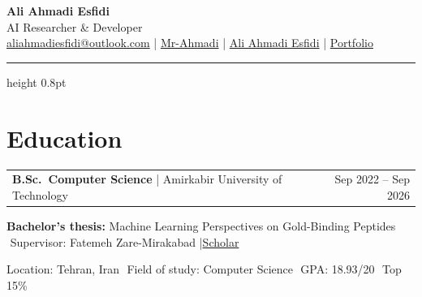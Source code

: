 \documentclass[10pt,a4paper]{article}
\makeatletter
\newcommand{\tdot}{{\color{dotcol}\,\textbullet\,\allowbreak}}
\newcommand{\cvbullet}{\item[\color{accent}\tiny\faCircle]}
\newcommand{\cvhead}[3]{%
    \begin{tabularx}{\linewidth}{@{}Xr@{}}
        \textbf{\color{darkgray}#1}%
        \textcolor{rulecol}{\small\;|\;}%
        \textcolor{medgray}{\small #2} &
        {\small\color{lightgray}#3}
    \end{tabularx}%
}
\makeatother
\begin{document}
\begin{center}
    {\huge\bfseries\color{darkgray} Ali Ahmadi Esfidi}\\[5pt]
    {\color{accent} AI Researcher \& Developer}\\[7pt]
    {\small\color{medgray}
        \faEnvelope\;\href{mailto:aliahmadiesfidi@outlook.com}{aliahmadiesfidi@outlook.com}
        \quad\textcolor{dotcol}{|}\quad
        \faGithub\;\href{https://github.com/Mr-Ahmadi}{Mr-Ahmadi}
        \quad\textcolor{dotcol}{|}\quad
        \faLinkedin\;\href{https://www.linkedin.com/in/ali-ahmadi-esfidi/}{Ali Ahmadi Esfidi}
        \quad\textcolor{dotcol}{|}\quad
        \faGlobe\;\href{https://mr-ahmadi.github.io/Portfolio/}{Portfolio}
    }
\end{center}
\vspace{5pt}
{\color{rulecol}\hrule height 0.8pt}

\vspace{4pt}
\vspace{0pt}

\section{Education}

\cvhead{B.Sc.\ Computer Science}{Amirkabir University of Technology}%
       {Sep 2022 -- Sep 2026}
\begin{cvitems}
    \cvbullet {\color{medgray}
        \textbf{Bachelor's thesis:}\enspace
        {\color{darkgray}Machine Learning Perspectives on Gold-Binding Peptides}%
        \hspace{3pt}\href{https://github.com/Mr-Ahmadi/Gold-Binding-Peptides}{\small\color{lightgray}\faGithub}\\[-1pt]
        \tdot Supervisor: Fatemeh Zare-Mirakabad%
        \textcolor{rulecol}{\small\;|\;}\href{https://scholar.google.com/citations?user=0rwrLKkAAAAJ\&hl=en}{{\small\color{accent}Scholar}}}
    \cvbullet {\color{medgray}
        Location: Tehran, Iran \tdot Field of study: Computer Science
        \tdot GPA: 18.93/20 \tdot Top 15\%}
\end{cvitems}
\end{document}
